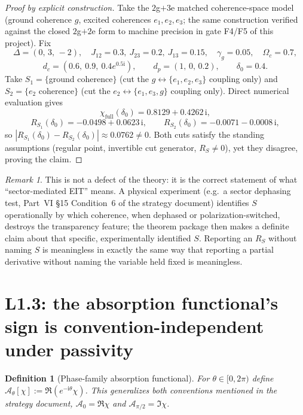 \documentclass[11pt,a4paper]{article}
\newtheorem{definition}[theorem]{Definition}
\theoremstyle{remark}
\newtheorem{remark}[theorem]{Remark}
\newcommand{\im}{\mathrm{i}}
\begin{document}
\begin{proof}[Proof by explicit construction]
Take the $2$g$+3$e matched coherence-space model (ground coherence $g$,
excited coherences $e_1,e_2,e_3$; the same construction verified against
the closed $2$g$+2$e form to machine precision in gate F4/F5 of this
project). Fix
\[
\Delta=(0,\,3,\,-2),\quad
J_{12}=0.3,\ J_{23}=0.2,\ J_{13}=0.15,\quad
\gamma_g=0.05,\quad \Omega_c=0.7,
\]
\[
d_c=(0.6,\ 0.9,\ 0.4e^{0.5\im}),\qquad d_p=(1,\,0,\,0.2),\qquad
\delta_0=0.4 .
\]
Take $S_1=\{$ground coherence$\}$ (cut the $g\leftrightarrow\{e_1,e_2,e_3\}$
coupling only) and $S_2=\{e_2\text{ coherence}\}$ (cut the
$e_2\leftrightarrow\{e_1,e_3,g\}$ coupling only). Direct numerical
evaluation gives
\[
\chi_{\mathrm{full}}(\delta_0)=0.8129+0.4262\,\im,
\]
\[
R_{S_1}(\delta_0)=-0.0498+0.0623\,\im,\qquad
R_{S_2}(\delta_0)=-0.0071-0.0008\,\im,
\]
so $|R_{S_1}(\delta_0)-R_{S_2}(\delta_0)|\approx0.0762\neq0$. Both cuts
satisfy the standing assumptions (regular point, invertible cut
generator, $R_S\neq0$), yet they disagree, proving the claim.
\end{proof}

\begin{remark}
This is not a defect of the theory: it is the correct statement of what
``sector-mediated EIT'' means. A physical experiment (e.g.\ a sector
dephasing test, Part~VI \S15 Condition~6 of the strategy document)
identifies $S$ operationally by which coherence, when dephased or
polarization-switched, destroys the transparency feature; the theorem
package then makes a definite claim about that specific, experimentally
identified $S$. Reporting an $R_S$ without naming $S$ is meaningless in
exactly the same way that reporting a partial derivative without naming
the variable held fixed is meaningless.
\end{remark}

\section{L1.3: the absorption functional's sign is convention-independent
under passivity}

\begin{definition}[Phase-family absorption functional]
For $\theta\in[0,2\pi)$ define $\mathcal A_\theta[\chi]:=\Re(e^{-\im\theta}\chi)$.
This generalizes both conventions mentioned in the strategy document,
$\mathcal A_0=\Re\chi$ and $\mathcal A_{\pi/2}=\Im\chi$.
\end{definition}
\end{document}
